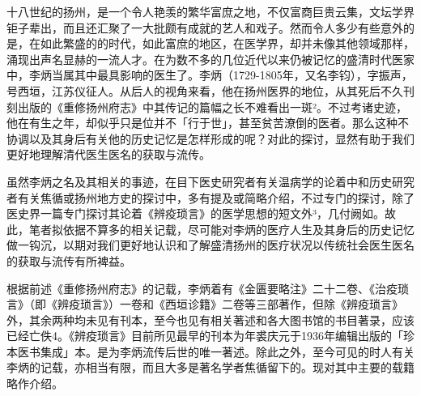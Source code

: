 十八世纪的扬州，是一个令人艳羡的繁华富庶之地，不仅富商巨贵云集，文坛学界钜子辈出，而且还汇聚了一大批颇有成就的艺人和戏子。然而令人多少有些意外的是，在如此繁盛的的时代，如此富庶的地区，在医学界，却并未像其他领域那样，涌现出声名显赫的一流人才。在为数不多的几位近代以来仍被记忆的盛清时代医家中，李炳当属其中最具影响的医生了。李炳（1729-1805年，又名李钧），字振声，号西垣，江苏仪征人。从后人的视角来看，他在扬州医界的地位，从其死后不久刊刻出版的《重修扬州府志》中其传记的篇幅之长不难看出一斑²。不过考诸史迹，他在有生之年，却似乎只是位并不「行于世」，甚至贫苦潦倒的医者。那么这种不协调以及其身后有关他的历史记忆是怎样形成的呢？对此的探讨，显然有助于我们更好地理解清代医生医名的获取与流传。

虽然李炳之名及其相关的事迹，在目下医史研究者有关温病学的论着中和历史研究者有关焦循或扬州地方史的探讨中，多有提及或简略介绍，不过专门的探讨，除了医史界一篇专门探讨其论着《辨疫琐言》的医学思想的短文外³，几付阙如。故此，笔者拟依据不算多的相关记载，尽可能对李炳的医疗人生及其身后的历史记忆做一钩沉，以期对我们更好地认识和了解盛清扬州的医疗状况以传统社会医生医名的获取与流传有所裨益。

\vfill
\begin{BookNotes}
\end{BookNotes}


根据前述《重修扬州府志》的记载，李炳着有《金匮要略注》二十二卷、《治疫琐言》（即《辨疫琐言》）一卷和《西垣诊籍》二卷等三部著作，但除《辨疫琐言》外，其余两种均未见有刊本，至今也见有相关著述和各大图书馆的书目著录，应该已经亡佚4。《辨疫琐言》目前所见最早的刊本为年裘庆元于1936年编辑出版的「珍本医书集成」本。是为李炳流传后世的唯一著述。除此之外，至今可见的时人有关李炳的记载，亦相当有限，而且大多是著名学者焦循留下的。现对其中主要的载籍略作介绍。

